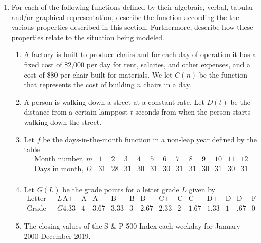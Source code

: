 \documentclass[
]{book}
\theoremstyle{definition}
\theoremstyle{definition}
\theoremstyle{definition}
\theoremstyle{remark}
\begin{document}
\begin{enumerate}
\def\labelenumi{\arabic{enumi}.}
\item
  For each of the following functions defined by their algebraic, verbal, tabular and/or graphical representation, describe the function according the the various properties described in this section. Furthermore, describe how these properties relate to the situation being modeled.

  \begin{enumerate}
  \def\labelenumii{\alph{enumii}.}
  \item
    A factory is built to produce chairs and for each day of operation it has a fixed cost of \$2,000 per day for rent, salaries, and other expenses, and a cost of \$80 per chair built for materials. We let \(C(n)\) be the function that represents the cost of building \(n\) chairs in a day.
  \item
    A person is walking down a street at a constant rate. Let \(D(t)\) be the distance from a certain lamppost \(t\) seconds from when the person starts walking down the street.
  \item
    Let \(f\) be the days-in-the-month function in a non-leap year defined by the table
    \[\begin{array}{l|cccccccccccc}
         \mbox{Month number, } m & 1 & 2 & 3 & 4 & 5 & 6 & 7 & 8 & 9 & 10 & 11 & 12 \\ \hline
         \mbox{Days in month, } D & 31 & 28 & 31 & 30 & 31 & 30 & 31 & 31 & 30 & 31 & 30 & 31 \\
         \end{array}\]
  \item
    Let \(G(L)\) be the grade points for a letter grade \(L\) given by
    \[\begin{array}{l|ccccccccccccc}
         \mbox{Letter grade, } L & \mbox{A+} & \mbox{A} & \mbox{A-} & \mbox{B+} & \mbox{B} & \mbox{B-} & \mbox{C+} & \mbox{C} & \mbox{C-} & \mbox{D+} & \mbox{D} & \mbox{D-} & \mbox{F} \\ \hline
         \mbox{Grade Points, } G & 4.33 & 4 & 3.67 & 3.33 & 3 & 2.67 & 2.33 & 2 & 1.67 & 1.33 & 1 & .67 & 0 
         \end{array}\]
  \item
    The closing values of the S \& P 500 Index each weekday for January 2000-December 2019.
  \end{enumerate}

  \begin{figure}


\end{figure}
\end{enumerate}
\end{document}
